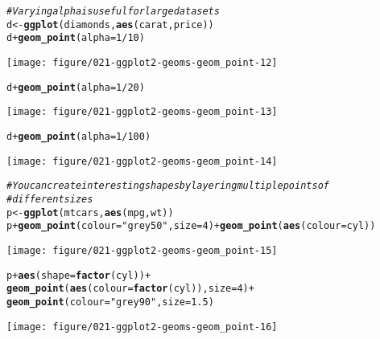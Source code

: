 \documentclass[a4paper,titlepage]{tufte-handout}\usepackage[]{graphicx}\usepackage[]{color}
\makeatletter
\def\maxwidth{ %
  \ifdim\Gin@nat@width>\linewidth
    \linewidth
  \else
    \Gin@nat@width
  \fi
}
\newcommand{\hlnum}[1]{\textcolor[rgb]{0.686,0.059,0.569}{#1}}%
\newcommand{\hlstr}[1]{\textcolor[rgb]{0.192,0.494,0.8}{#1}}%
\newcommand{\hlcom}[1]{\textcolor[rgb]{0.678,0.584,0.686}{\textit{#1}}}%
\newcommand{\hlopt}[1]{\textcolor[rgb]{0,0,0}{#1}}%
\newcommand{\hlstd}[1]{\textcolor[rgb]{0.345,0.345,0.345}{#1}}%
\newcommand{\hlkwb}[1]{\textcolor[rgb]{0.69,0.353,0.396}{#1}}%
\newcommand{\hlkwc}[1]{\textcolor[rgb]{0.333,0.667,0.333}{#1}}%
\newcommand{\hlkwd}[1]{\textcolor[rgb]{0.737,0.353,0.396}{\textbf{#1}}}%
\newenvironment{kframe}{%
 \def\at@end@of@kframe{}%
 \ifinner\ifhmode%
  \def\at@end@of@kframe{\end{minipage}}%
  \begin{minipage}{\columnwidth}%
 \fi\fi%
 \def\FrameCommand##1{\hskip\@totalleftmargin \hskip-\fboxsep
 \colorbox{shadecolor}{##1}\hskip-\fboxsep
     \hskip-\linewidth \hskip-\@totalleftmargin \hskip\columnwidth}%
 \MakeFramed {\advance\hsize-\width
   \@totalleftmargin\z@ \linewidth\hsize
   \@setminipage}}%
 {\par\unskip\endMakeFramed%
 \at@end@of@kframe}
\newenvironment{knitrout}{}{} %
\makeatother
\begin{document}
\begin{knitrout}
\begin{kframe}
\begin{alltt}
\hlcom{# Varying alpha is useful for large datasets}
\hlstd{d} \hlkwb{<-} \hlkwd{ggplot}\hlstd{(diamonds,} \hlkwd{aes}\hlstd{(carat, price))}
\hlstd{d} \hlopt{+} \hlkwd{geom_point}\hlstd{(}\hlkwc{alpha} \hlstd{=} \hlnum{1}\hlopt{/}\hlnum{10}\hlstd{)}
\end{alltt}
\end{kframe}
\texttt{[image: figure/021-ggplot2-geoms-geom\_point-12]} 
\begin{kframe}\begin{alltt}
\hlstd{d} \hlopt{+} \hlkwd{geom_point}\hlstd{(}\hlkwc{alpha} \hlstd{=} \hlnum{1}\hlopt{/}\hlnum{20}\hlstd{)}
\end{alltt}
\end{kframe}
\texttt{[image: figure/021-ggplot2-geoms-geom\_point-13]} 
\begin{kframe}\begin{alltt}
\hlstd{d} \hlopt{+} \hlkwd{geom_point}\hlstd{(}\hlkwc{alpha} \hlstd{=} \hlnum{1}\hlopt{/}\hlnum{100}\hlstd{)}
\end{alltt}
\end{kframe}
\texttt{[image: figure/021-ggplot2-geoms-geom\_point-14]} 
\begin{kframe}\begin{alltt}
\hlcom{# You can create interesting shapes by layering multiple points of}
\hlcom{# different sizes}
\hlstd{p} \hlkwb{<-} \hlkwd{ggplot}\hlstd{(mtcars,} \hlkwd{aes}\hlstd{(mpg, wt))}
\hlstd{p} \hlopt{+} \hlkwd{geom_point}\hlstd{(}\hlkwc{colour}\hlstd{=}\hlstr{"grey50"}\hlstd{,} \hlkwc{size} \hlstd{=} \hlnum{4}\hlstd{)} \hlopt{+} \hlkwd{geom_point}\hlstd{(}\hlkwd{aes}\hlstd{(}\hlkwc{colour} \hlstd{= cyl))}
\end{alltt}
\end{kframe}
\texttt{[image: figure/021-ggplot2-geoms-geom\_point-15]} 
\begin{kframe}\begin{alltt}
\hlstd{p} \hlopt{+} \hlkwd{aes}\hlstd{(}\hlkwc{shape} \hlstd{=} \hlkwd{factor}\hlstd{(cyl))} \hlopt{+}
  \hlkwd{geom_point}\hlstd{(}\hlkwd{aes}\hlstd{(}\hlkwc{colour} \hlstd{=} \hlkwd{factor}\hlstd{(cyl)),} \hlkwc{size} \hlstd{=} \hlnum{4}\hlstd{)} \hlopt{+}
  \hlkwd{geom_point}\hlstd{(}\hlkwc{colour}\hlstd{=}\hlstr{"grey90"}\hlstd{,} \hlkwc{size} \hlstd{=} \hlnum{1.5}\hlstd{)}
\end{alltt}
\end{kframe}
\texttt{[image: figure/021-ggplot2-geoms-geom\_point-16]} 
\begin{kframe}\begin{alltt}

\end{alltt}
\end{kframe}
\end{knitrout}
\end{document}

